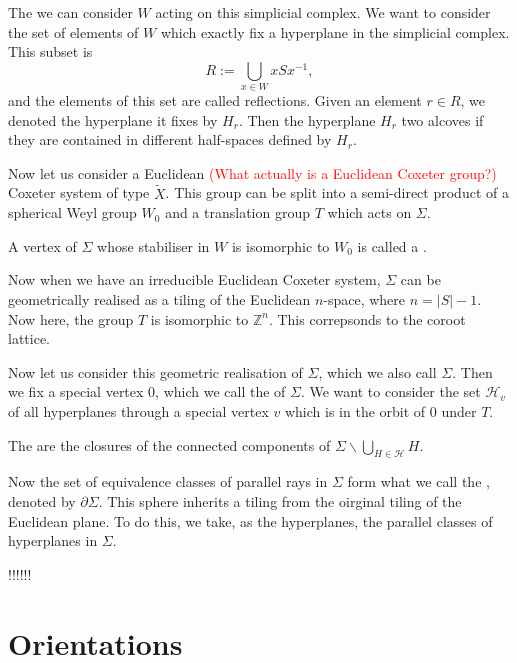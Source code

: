 \documentclass[12pt]{article}
\begin{document}
The we can consider $W$ acting on this simplicial complex.
We want to consider the set of elements of $W$ which exactly fix a hyperplane in the simplicial complex. This subset is
\[R:=\bigcup_{x\in W}xSx^{-1},\]
and the elements of this set are called reflections. Given an element $r\in R$, we denoted the hyperplane it fixes by $H_r$. Then the hyperplane $H_r$  two alcoves if they are contained in different half-spaces defined by $H_r$. 

Now let us consider a Euclidean \textcolor{red}{(What actually is a Euclidean Coxeter group?)} Coxeter system of type $\tilde{X}$. This group can be split into a semi-direct product of a spherical Weyl group $W_0$ and a translation group $T$ which acts on $\Sigma$.
\begin{definition}
    A vertex of $\Sigma$ whose stabiliser in $W$ is isomorphic to $W_0$ is called a .
\end{definition}

Now when we have an irreducible Euclidean Coxeter system, $\Sigma$ can be geometrically realised as a tiling of the Euclidean $n$-space, where $n=|S|-1$. Now here, the group $T$ is isomorphic to $\mathbb{Z}^n$. This correpsonds to the coroot lattice. 

Now let us consider this geometric realisation of $\Sigma$, which we also call $\Sigma$. Then we fix a special vertex 0, which we call the  of $\Sigma$. We want to consider the set $\mathcal{H}_v$ of all hyperplanes through a special vertex $v$ which is in the orbit of 0 under $T$. 

\begin{definition}
    The  are the closures of the connected components of $\Sigma\backslash \bigcup_{H\in\mathcal{H}}H$.
\end{definition}

Now the set of equivalence classes of parallel rays in $\Sigma$ form what we call the , denoted by $\partial\Sigma$. This sphere inherits a tiling from the oirginal tiling of the Euclidean plane. To do this, we take, as the hyperplanes, the parallel classes of hyperplanes in $\Sigma$. 





!!!!!!


\section{Orientations}
\end{document}
